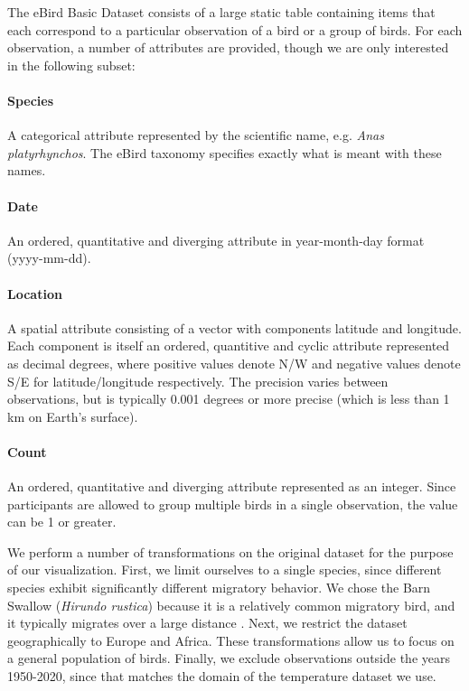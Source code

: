 \documentclass[journal]{vgtc}                %
\begin{document}

The eBird Basic Dataset \cite{ebird2020data} consists of a large static table containing items that each correspond to a particular observation of a bird or a group of birds. For each observation, a number of attributes are provided, though we are only interested in the following subset:

\paragraph{Species} A categorical attribute represented by the scientific name, e.g. \textit{Anas platyrhynchos}. The eBird taxonomy\cite{ebird2019taxonomy} specifies exactly what is meant with these names.

\paragraph{Date} An ordered, quantitative and diverging attribute in year-month-day format (yyyy-mm-dd).

\paragraph{Location} A spatial attribute consisting of a vector with components latitude and longitude. Each component is itself an ordered, quantitive and cyclic attribute represented as decimal degrees, where positive values denote N/W and negative values denote S/E for latitude/longitude respectively. The precision varies between observations, but is typically 0.001 degrees or more precise (which is less than 1 km on Earth's surface).

\paragraph{Count} An ordered, quantitative and diverging attribute represented as an integer. Since participants are allowed to group multiple birds in a single observation, the value can be 1 or greater.

\vspace{2mm}

We perform a number of transformations on the original dataset for the purpose of our visualization. First, we limit ourselves to a single species, since different species exhibit significantly different migratory behavior. We chose the Barn Swallow (\textit{Hirundo rustica}) because it is a relatively common migratory bird, and it typically migrates over a large distance \cite{turner1989swallow}. Next, we restrict the dataset geographically to Europe and Africa. These transformations allow us to focus on a general population of birds. Finally, we exclude observations outside the years 1950-2020, since that matches the domain of the temperature dataset we use.
\end{document}
